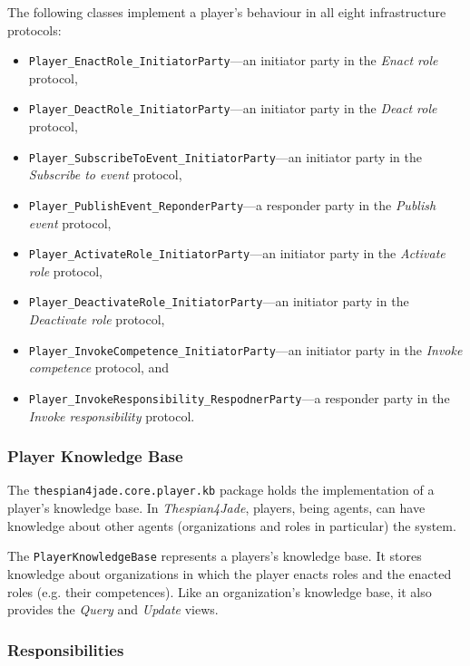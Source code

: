 The following classes implement a player's behaviour in all eight infrastructure protocols:
\begin{itemize}
	\item \texttt{Player\_EnactRole\_InitiatorParty}---an initiator party in the \textit{Enact role} protocol,
	\item \texttt{Player\_DeactRole\_InitiatorParty}---an initiator party in the \textit{Deact role} protocol,
	\item \texttt{Player\_SubscribeToEvent\_InitiatorParty}---an initiator party in the \textit{Subscribe to event} protocol,
	\item \texttt{Player\_PublishEvent\_ReponderParty}---a responder party in the \textit{Publish event} protocol,
	\item \texttt{Player\_ActivateRole\_InitiatorParty}---an initiator party in the \textit{Activate role} protocol,
	\item \texttt{Player\_DeactivateRole\_InitiatorParty}---an initiator party in the \textit{Deactivate role} protocol,
	\item\texttt{Player\_InvokeCompetence\_InitiatorParty}---an initiator party in the \textit{Invoke competence} protocol, and
	\item\texttt{Player\_InvokeResponsibility\_RespodnerParty}---a responder party in the \textit{Invoke responsibility} protocol.
\end{itemize}

\subsubsection{Player Knowledge Base}

The \texttt{thespian4jade.core.player.kb} package holds the implementation of a player's knowledge base.
In \textit{Thespian4Jade}, players, being agents, can have knowledge about other agents (organizations and roles in particular) the system.

The \texttt{PlayerKnowledgeBase} represents a players's knowledge base.
It stores knowledge about organizations in which the player enacts roles and the enacted roles (e.g. their competences).
Like an organization's knowledge base, it also provides the \textit{Query} and \textit{Update} views.

\subsubsection{Responsibilities}

